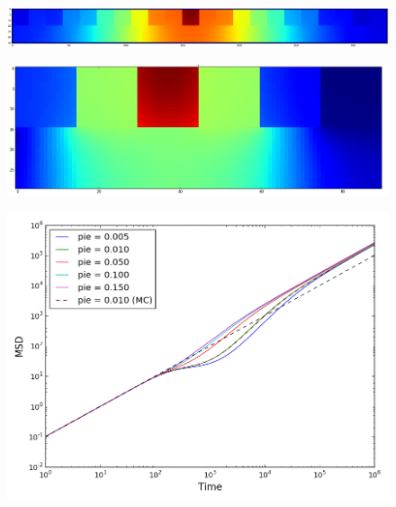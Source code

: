 	\begin{figure}[h]
		\centering
		\includegraphics[width=1.0\linewidth]{../images/2D/heterogeneous_11U_2D}
		\caption{}
		\label{fig:heterogeneous_11U_2D}
	\end{figure}
	
	\begin{figure}[h]
		\centering
		\includegraphics[width=1.0\linewidth]{../images/2D/error_in_diffusion}
		\caption{}
		\label{fig:error_in_diffusion}
	\end{figure}
	
	\begin{figure}[h]
		\centering
		\includegraphics[width=1.0\linewidth]{../images/2D/pie_msd_2D}
		\caption{}
		\label{fig:pie_msd_2D}
	\end{figure}
	
